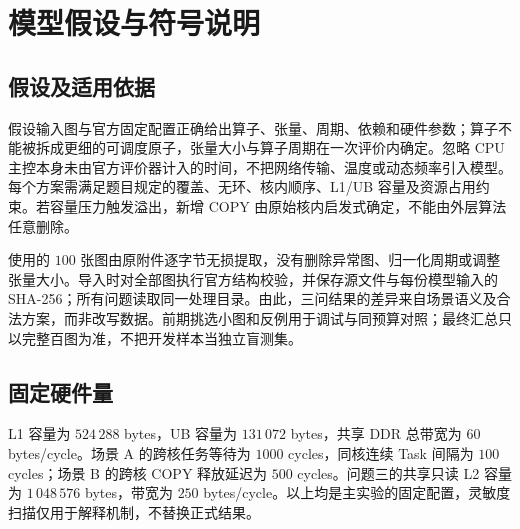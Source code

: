 \section{模型假设与符号说明}
\subsection{假设及适用依据}
假设输入图与官方固定配置正确给出算子、张量、周期、依赖和硬件参数；算子不能被拆成更细的可调度原子，张量大小与算子周期在一次评价内确定。忽略 CPU 主控本身未由官方评价器计入的时间，不把网络传输、温度或动态频率引入模型。每个方案需满足题目规定的覆盖、无环、核内顺序、L1/UB 容量及资源占用约束。若容量压力触发溢出，新增 COPY 由原始核内启发式确定，不能由外层算法任意删除。

使用的 $100$ 张图由原附件逐字节无损提取，没有删除异常图、归一化周期或调整张量大小。导入时对全部图执行官方结构校验，并保存源文件与每份模型输入的 SHA-256；所有问题读取同一处理目录。由此，三问结果的差异来自场景语义及合法方案，而非改写数据。前期挑选小图和反例用于调试与同预算对照；最终汇总只以完整百图为准，不把开发样本当独立盲测集。

\subsection{固定硬件量}
L1 容量为 $524\,288$ bytes，UB 容量为 $131\,072$ bytes，共享 DDR 总带宽为 $60$ bytes/cycle。场景 A 的跨核任务等待为 $1000$ cycles，同核连续 Task 间隔为 $100$ cycles；场景 B 的跨核 COPY 释放延迟为 $500$ cycles。问题三的共享只读 L2 容量为 $1\,048\,576$ bytes，带宽为 $250$ bytes/cycle。以上均是主实验的固定配置，灵敏度扫描仅用于解释机制，不替换正式结果。
